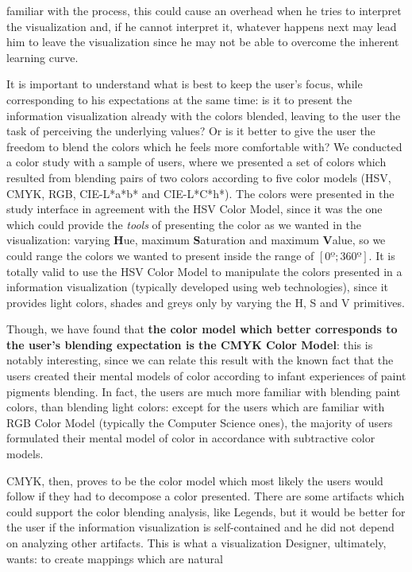 familiar with the process, this could cause an overhead when he tries to interpret the visualization and, if he cannot interpret it, whatever
happens next may lead him to leave the visualization since he may not be able to overcome the inherent learning curve. \par
%
It is important to understand what is best to keep the user's focus, while corresponding to his expectations at the same time: is it to present the
information visualization already with the colors blended, leaving to the user the task of perceiving the underlying values? Or is it better to give
the user the freedom to blend the colors which he feels more comfortable with? We conducted a color study with a sample of users, where we presented
a set of colors which resulted from blending pairs of two colors according to five color models (HSV, CMYK, RGB, CIE-L*a*b* and CIE-L*C*h*). The colors
were presented in the study interface in agreement with the HSV Color Model, since it was the one which could provide the \emph{tools} of presenting the
color as we wanted in the visualization: varying \textbf{H}ue, maximum \textbf{S}aturation and maximum \textbf{V}alue, so we could range the colors we
wanted to present inside the range of $[0º ; 360º]$. It is totally valid to use the HSV Color Model to manipulate the colors presented in a information
visualization (typically developed using web technologies), since it provides light colors, shades and greys only by varying the H, S and V primitives. \par
%
Though, we have found that \textbf{the color model which better corresponds to the user's blending expectation is the CMYK Color Model}: this is
notably interesting, since we can relate this result with the known fact that the users created their mental models of color according to infant
experiences of paint pigments blending. In fact, the users are much more familiar with blending paint colors, than blending light colors: except
for the users which are familiar with RGB Color Model (typically the Computer Science ones), the majority of users formulated their mental model of
color in accordance with subtractive color models. \par
%
CMYK, then, proves to be the color model which most likely the users would follow if they had to decompose a color presented. There are some artifacts
which could support the color blending analysis, like Legends, but it would be better for the user if the information visualization is self-contained
and he did not depend on analyzing other artifacts. This is what a visualization Designer, ultimately, wants: to create mappings which are natural
